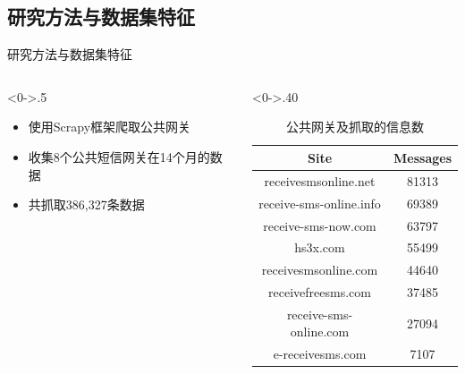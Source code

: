 \documentclass[10pt,aspectratio=43,mathserif]{beamer}
\begin{document}
\subsection{研究方法与数据集特征}
\begin{frame}{研究方法与数据集特征}
\begin{columns}[T] %
	\begin{column}<0->{.5\textwidth}
		\vspace*{1cm}
		\begin{itemize}
			\item 使用Scrapy框架爬取公共网关
		\end{itemize}
	
		\begin{itemize}
			\item 收集8个公共短信网关在14个月的数据
		\end{itemize}
	
		\begin{itemize}
			\item 共抓取386,327条数据
		\end{itemize}
    \end{column}%
\hfill%
	\begin{column}<0->{.40\textwidth}
		\begin{table}
			\caption{公共网关及抓取的信息数}
			\label{table1:gateways}
			\centering
			\footnotesize
			\begin{tabular}{|c|c|}
				\hline
				\textbf{Site}           & \textbf{Messages}\\
				\hline
				receivesmsonline.net    &81313\\
				\hline
				receive-sms-online.info &69389\\
				\hline
				receive-sms-now.com     &63797\\
				\hline
				hs3x.com               &55499\\
				\hline
				receivesmsonline.com    &44640\\
				\hline
				receivefreesms.com      &37485\\
				\hline
				receive-sms-online.com  &27094\\
				\hline
				e-receivesms.com       &7107\\
				\hline
			\end{tabular}
		\end{table}
    \end{column}%
\end{columns}
\end{frame}
\end{document}
